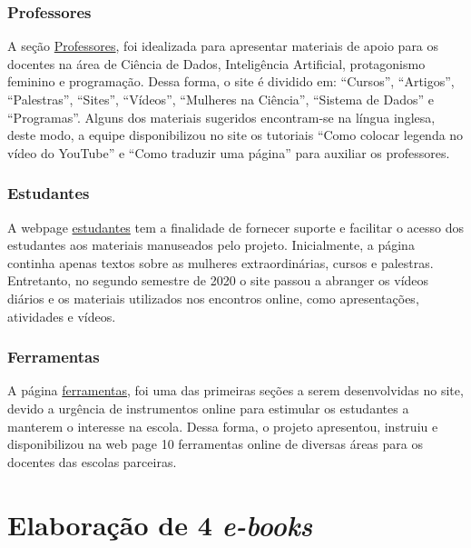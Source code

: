 \documentclass[
]{book}
\begin{document}
\hypertarget{professores}{%
\subsection*{Professores}\label{professores}}

A seção \href{https://cienciadedadosep.wixsite.com/professores}{Professores}, foi idealizada para apresentar materiais de apoio para os docentes na área de Ciência de Dados, Inteligência Artificial, protagonismo feminino e programação. Dessa forma, o site é dividido em: ``Cursos'', ``Artigos'', ``Palestras'', ``Sites'', ``Vídeos'', ``Mulheres na Ciência'', ``Sistema de Dados'' e ``Programas''.
Alguns dos materiais sugeridos encontram-se na língua inglesa, deste modo, a equipe disponibilizou no site os tutoriais ``Como colocar legenda no vídeo do YouTube'' e ``Como traduzir uma página'' para auxiliar os professores.

\hypertarget{estudantes}{%
\subsection*{Estudantes}\label{estudantes}}

A webpage \href{https://cienciadedadosep.wixsite.com/estudantes}{estudantes} tem a finalidade de fornecer suporte e facilitar o acesso dos estudantes aos materiais manuseados pelo projeto. Inicialmente, a página continha apenas textos sobre as mulheres extraordinárias, cursos e palestras. Entretanto, no segundo semestre de 2020 o site passou a abranger os vídeos diários e os materiais utilizados nos encontros online, como apresentações, atividades e vídeos.

\hypertarget{ferramentas}{%
\subsection*{Ferramentas}\label{ferramentas}}

A página \href{https://cienciadedadosep.wixsite.com/cdep/ferramentas}{ferramentas}, foi uma das primeiras seções a serem desenvolvidas no site, devido a urgência de instrumentos online para estimular os estudantes a manterem o interesse na escola. Dessa forma, o projeto apresentou, instruiu e disponibilizou na web page 10 ferramentas online de diversas áreas para os docentes das escolas parceiras.

\hypertarget{elaborauxe7uxe3o-de-4-e-books}{%
\chapter{\texorpdfstring{Elaboração de 4 \emph{e-books}}{Elaboração de 4 e-books}}\label{elaborauxe7uxe3o-de-4-e-books}}
\end{document}
